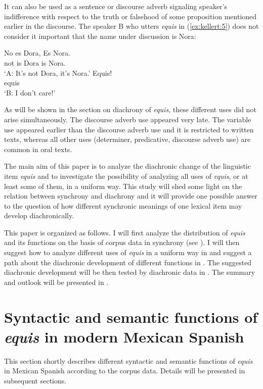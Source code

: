 \documentclass[output=paper]{langsci/langscibook}
\begin{document}
It can also be used as a sentence or discourse adverb signaling speaker’s indifference with respect to the truth or falsehood of some proposition mentioned earlier in the discourse. The speaker B who utters \textit{equis} in (\ref{ex:kellert:5}) does not consider it important that the name under discussion is Nora:

\ea\label{ex:kellert:5}
\begin{xlist}
\gll No es Dora, Es Nora.\\
not is Dora is Nora.\\
\glt ‘A: It’s not Dora, it’s Nora.’
\gll Equis!\\
equis\\
\glt ‘B: I don’t care!’
\end{xlist}
\z

As will be shown in the section on diachrony of \textit{equis}, these different uses did not arise simultaneously. The discourse adverb use appeared very late. The variable use appeared earlier than the discourse adverb use and it is restricted to written texts, whereas all other uses (determiner, predicative, discourse adverb use) are common in oral texts.

The main aim of this paper is to analyze the diachronic change of the linguistic item \textit{equis} and to investigate the possibility of analyzing all uses of \textit{equis}, or at least some of them, in a uniform way.
This study will shed some light on the relation between synchrony and diachrony and it will provide one possible answer to the question of how different synchronic meanings of one lexical item may develop diachronically.

This paper is organized as follows. I will first analyze the distribution of \textit{equis} and its functions on the basis of corpus data in synchrony (see ). I will then suggest how to analyze different uses of \textit{equis} in a uniform way in  and suggest a path about the diachronic development of different functions in . The suggested diachronic development will be then tested by diachronic data in . The summary and outlook will be presented in .

\section{Syntactic and semantic functions of \textit{equis} in modern Mexican Spanish}\label{sec:kellert:2}
This section shortly describes different syntactic and semantic functions of \textit{equis} in Mexican Spanish according to the corpus data. Details will be presented in subsequent sections.
\end{document}
